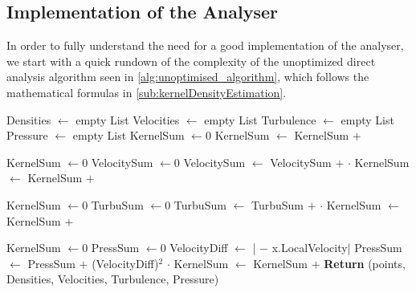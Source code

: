 \subsection{Implementation of the Analyser}\label{sec:kernelDensityEstimation}

In order to fully understand the need for a good implementation of the analyser, we start with a quick rundown of the complexity of the unoptimized direct analysis algorithm seen in \cref{alg:unoptimised_algorithm}, which follows the mathematical formulas in \cref{sub:kernelDensityEstimation}.

\begin{center}
\label{alg:unoptimised_algorithm}
\begin{algorithmic}[1]

\State Densities $\gets$ empty List
\State Velocities $\gets$ empty List
\State Turbulence $\gets$ empty List
\State Pressure $\gets$ empty List
    \State KernelSum $\gets 0$
        \State KernelSum $\gets$ KernelSum $+$ 
    \EndFor
    \State {}
\EndFor

    \State KernelSum $\gets 0$
    \State VelocitySum $\gets 0$
        \State VelocitySum $\gets$ VelocitySum $+$  $\cdot$ 
        \State KernelSum $\gets$ KernelSum $+$ 
    \EndFor
    \State {}
\EndFor

    \State KernelSum $\gets 0$
    \State TurbuSum $\gets 0$
        \State TurbuSum $\gets$ TurbuSum $+$  $\cdot$ 
        \State KernelSum $\gets$ KernelSum $+$ 
    \EndFor
    \State {}
\EndFor

    \State KernelSum $\gets 0$
    \State PressSum $\gets 0$
        \State VelocityDiff $\gets$ | $-$ x.LocalVelocity|
        \State PressSum $\gets$ PressSum $+$ (VelocityDiff)$^2$ $\cdot$ 
        \State KernelSum $\gets$ KernelSum $+$ 
    \EndFor
    \State {}
\EndFor
\State\textbf{Return} (points, Densities, Velocities, Turbulence, Pressure)
\EndFunction
\end{algorithmic}
\end{center}

